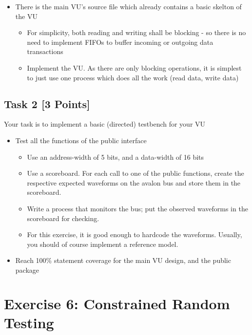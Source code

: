 \documentclass[12pt,epsf,makeidx,oneside]{book}
\begin{document}
\begin{itemize}[noitemsep]
\begin{itemize}[noitemsep]
    \end{itemize}
    \item There is the main VU's source file which already contains a basic skelton of the VU
    \begin{itemize}[noitemsep]
      \item For simplicity, both reading and writing shall be blocking - so there is no need to implement FIFOs to buffer incoming or outgoing data transactions
      \item Implement the VU. As there are only blocking operations, it is simplest to just use one process which does all the work (read data, write data)
    \end{itemize}
  \end{itemize}

  \subsection{Task 2 [3 Points]}
  Your task is to implement a basic (directed) testbench for your VU
  \begin{itemize}[noitemsep]
    \item Test all the functions of the public interface
    \begin{itemize}[noitemsep]
      \item Use an address-width of 5 bits, and a data-width of 16 bits
      \item Use a scoreboard. For each call to one of the public functions, create the respective expected waveforms on the avalon bus and store them in the scoreboard.
      \item Write a process that monitors the bus; put the observed waveforms in the scoreboard for checking.
      \item For this exercise, it is good enough to hardcode the waveforms. Usually, you should of course implement a reference model.
    \end{itemize}
    \item Reach 100\% statement coverage for the main VU design, and the public package
  \end{itemize}


\section{Exercise 6: Constrained Random Testing}
\end{document}
